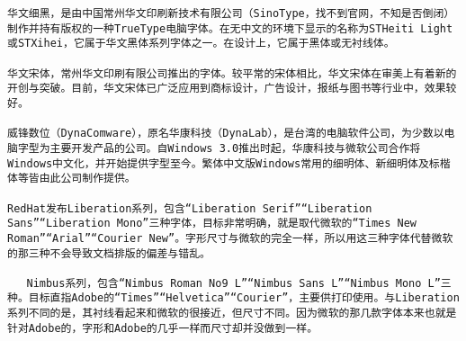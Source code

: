 \begin{verbatim}
华文细黑，是由中国常州华文印刷新技术有限公司（SinoType，找不到官网，不知是否倒闭）制作并持有版权的一种TrueType电脑字体。在无中文的环境下显示的名称为STHeiti Light或STXihei，它属于华文黑体系列字体之一。在设计上，它属于黑体或无衬线体。

华文宋体，常州华文印刷有限公司推出的字体。较平常的宋体相比，华文宋体在审美上有着新的开创与突破。目前，华文宋体已广泛应用到商标设计，广告设计，报纸与图书等行业中，效果较好。

威锋数位（DynaComware），原名华康科技（DynaLab），是台湾的电脑软件公司，为少数以电脑字型为主要开发产品的公司。自Windows 3.0推出时起，华康科技与微软公司合作将Windows中文化，并开始提供字型至今。繁体中文版Windows常用的细明体、新细明体及标楷体等皆由此公司制作提供。

RedHat发布Liberation系列，包含“Liberation Serif”“Liberation Sans”“Liberation Mono”三种字体，目标非常明确，就是取代微软的“Times New Roman”“Arial”“Courier New”。字形尺寸与微软的完全一样，所以用这三种字体代替微软的那三种不会导致文档排版的偏差与错乱。

   Nimbus系列，包含“Nimbus Roman No9 L”“Nimbus Sans L”“Nimbus Mono L”三种。目标直指Adobe的“Times”“Helvetica”“Courier”，主要供打印使用。与Liberation系列不同的是，其衬线看起来和微软的很接近，但尺寸不同。因为微软的那几款字体本来也就是针对Adobe的，字形和Adobe的几乎一样而尺寸却并没做到一样。

\end{verbatim}

















